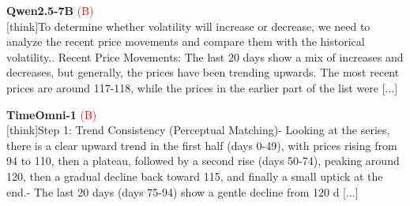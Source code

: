 \noindent
\begin{minipage}[t]{0.28\textwidth}
\colorbox{red!8}{\parbox{\dimexpr\textwidth-2\fboxsep}{
\textbf{Qwen2.5-7B} \textcolor{red}{(B)} \\[2pt]
\tiny
[think]\newline To determine whether volatility will increase or decrease, we need to analyze the recent price movements and compare them with the historical volatility.. Recent Price Movements: The last 20 days show a mix of increases and decreases, but generally, the prices have been trending upwards. The most recent prices are around 117-118, while the prices in the earlier part of the list were  [...]
}}
\end{minipage}
\hfill
\begin{minipage}[t]{0.28\textwidth}
\colorbox{red!8}{\parbox{\dimexpr\textwidth-2\fboxsep}{
\textbf{TimeOmni-1} \textcolor{red}{(B)} \\[2pt]
\tiny
[think]\newline Step 1: Trend Consistency (Perceptual Matching)\newline - Looking at the series, there is a clear upward trend in the first half (days 0-49), with prices rising from  94 to  110, then a plateau, followed by a second rise (days 50-74), peaking around 120, then a gradual decline back toward  115, and finally a small uptick at the end.\newline - The last 20 days (days 75-94) show a gentle decline from  120 d [...]
}}
\end{minipage}
\hfill
